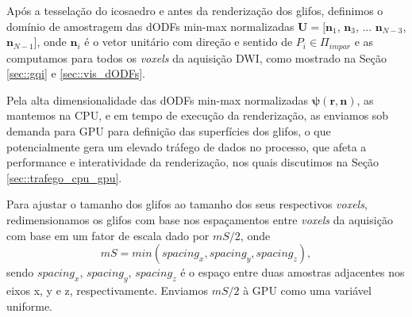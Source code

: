 Após a tesselação do icosaedro e antes da renderização dos glifos, definimos o domínio de amostragem das dODFs min-max normalizadas $\mathbf{U} = [
\mathbf{n}_1$,
$\mathbf{n}_3$, ...
$\mathbf{n}_{N-3}$,
$\mathbf{n}_{N-1}]$, onde $\mathbf{n}_i$ é o vetor unitário com direção e sentido de $P_i \in \Pi_{impar}$
e as computamos para todos os \textit{voxels} da aquisição DWI, como mostrado na Seção \ref{sec::gqi} e \ref{sec::vis_dODFs}.

Pela alta dimensionalidade das dODFs min-max normalizadas $\boldsymbol{\psi}(\mathbf{r}, \mathbf{n})$, as mantemos na CPU, e em tempo de execução da renderização, as enviamos sob demanda para GPU para definição das superfícies dos glifos, o que potencialmente gera um elevado tráfego de dados no processo, que afeta a performance e interatividade da renderização, nos quais discutimos na Seção \ref{sec::trafego_cpu_gpu}.

Para ajustar o tamanho dos glifos ao tamanho dos seus respectivos \textit{voxels}, redimensionamos os glifos com base nos espaçamentos entre \textit{voxels} da aquisição \cite{voltoline2021} com base em um fator de escala dado por $mS/2$, onde
\begin{equation}
    mS = min(spacing_x, spacing_y, spacing_z),
\end{equation}
sendo  $spacing_x$, $spacing_y$, $spacing_z$ é o espaço entre duas amostras adjacentes nos eixos x, y e z, respectivamente. Enviamos $mS/2$ à GPU como uma variável uniforme.







